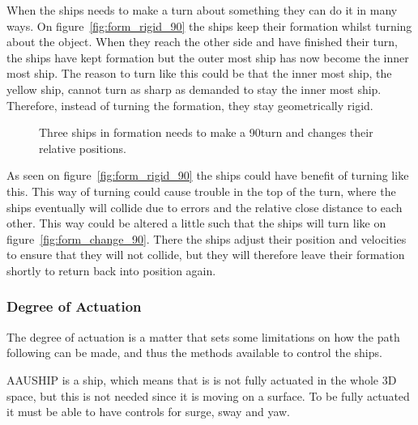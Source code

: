 When the ships needs to make a turn about something they can do it in many ways. On figure~\vref{fig:form_rigid_90} the ships keep their formation whilst turning about the object. When they reach the other side and have finished their turn, the ships have kept formation but the outer most ship has now become the inner most ship. The reason to turn like this could be that the inner most ship, the yellow ship, cannot turn as sharp as demanded to stay the inner most ship. Therefore, instead of turning the formation, they stay geometrically rigid.

\begin{figure}[htbp]
	\centering
	
	\caption{Three ships in formation needs to make a 90\textdegree turn and changes their relative positions.}
	\label{fig:form_change_90}
\end{figure}

As seen on figure~\vref{fig:form_rigid_90} the ships could have benefit of turning like this. This way of turning could cause trouble in the top of the turn, where the ships eventually will collide due to errors and the relative close distance to each other. This way could be altered a little such that the ships will turn like on figure~\vref{fig:form_change_90}. There the ships adjust their position and velocities to ensure that they will not collide, but they will therefore leave their formation shortly to return back into position again.

\subsubsection{Degree of Actuation}
The degree of actuation is a matter that sets some limitations on how
the path following can be made, and thus the methods available to
control the ships.

AAUSHIP is a ship, which means that is is not fully actuated in the
whole 3D space, but this is not needed since it is moving on a
surface. To be fully actuated it must be able to have controls for
surge, sway and yaw.

